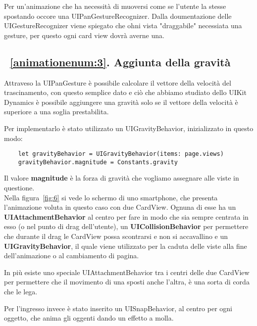 Per un'animazione che ha necessità di muoversi come se l'utente la stesse spostando occore una UIPanGestureRecognizer.
Dalla doumentazione delle UIGestureRecognizer viene spiegato che ohni vista "draggabile" necessiata una gesture,
per questo ogni card view dovrà averne una.

\subsection{~\ref{animationenum:3}. Aggiunta della gravità }

Attraveso la UIPanGesture è possibile calcolare il vettore della velocità del trascinamento,
con questo semplice dato e ciò che abbiamo studiato dello UIKit Dynamics è possibile aggiungere una gravità solo se
il vettore della velocità è superiore a una soglia prestabilita.

Per implementarlo è stato utilizzato un UIGravityBehavior, inizializzato in questo modo:

\begin{verbatim}
    let gravityBehavior = UIGravityBehavior(items: page.views)
    gravityBehavior.magnitude = Constants.gravity
\end{verbatim}

Il valore \textbf{magnitude} è la forza di gravità che vogliamo
assegnare alle viste in questione. \\

Nella figura~\ref{fig:6} si vede lo schermo di uno smartphone, che presenta l'animazione
voluta in questo caso con due CardView. Ognuna di esse ha un \textbf{UIAttachmentBehavior} al
centro per fare in modo che sia sempre centrata in esso (o nel punto di drag dell'utente),
un \textbf{UICollisionBehavior} per permettere che durante il drag le CardView possa scontrarsi e non si accavallino e un \textbf{UIGravityBehavior}, il quale 
viene utilizzato per la caduta delle viste alla fine dell'animazione o al cambiamento di pagina.

In più esiste uno speciale UIAttachmentBehavior tra i centri delle due CardView per permettere che il movimento di una
sposti anche l'altra, è una sorta di corda che le lega.

Per l'ingresso invece è stato inserito un UISnapBehavior, al centro per ogni oggetto, che anima 
gli oggenti dando un effetto a molla.

